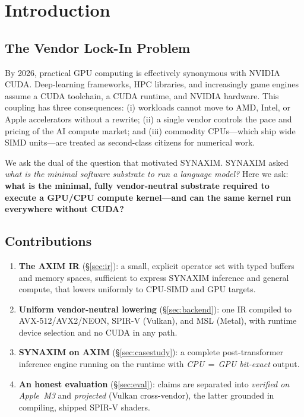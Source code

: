 \documentclass[11pt,a4paper]{article}
\begin{document}
\tableofcontents
\newpage

\section{Introduction}

\subsection{The Vendor Lock-In Problem}

By 2026, practical GPU computing is effectively synonymous with NVIDIA CUDA. Deep-learning
frameworks, HPC libraries, and increasingly game engines assume a CUDA toolchain, a CUDA
runtime, and NVIDIA hardware. This coupling has three consequences: (i) workloads cannot
move to AMD, Intel, or Apple accelerators without a rewrite; (ii) a single vendor controls
the pace and pricing of the AI compute market; and (iii) commodity CPUs---which ship wide
SIMD units---are treated as second-class citizens for numerical work.

We ask the dual of the question that motivated SYNAXIM. SYNAXIM asked \emph{what is the
minimal software substrate to run a language model?} Here we ask: \textbf{what is the
minimal, fully vendor-neutral substrate required to execute a GPU/CPU compute kernel---and
can the same kernel run everywhere without CUDA?}

\subsection{Contributions}

\begin{enumerate}
    \item \textbf{The AXIM IR} (\S\ref{sec:ir}): a small, explicit operator set with typed
    buffers and memory spaces, sufficient to express SYNAXIM inference and general compute,
    that lowers uniformly to CPU-SIMD and GPU targets.
    \item \textbf{Uniform vendor-neutral lowering} (\S\ref{sec:backend}): one IR compiled to
    AVX-512/AVX2/NEON, SPIR-V (Vulkan), and MSL (Metal), with runtime device selection and
    no CUDA in any path.
    \item \textbf{SYNAXIM on AXIM} (\S\ref{sec:casestudy}): a complete post-transformer
    inference engine running on the runtime with \emph{CPU\,$=$\,GPU bit-exact} output.
    \item \textbf{An honest evaluation} (\S\ref{sec:eval}): claims are separated into
    \emph{verified on Apple~M3} and \emph{projected} (Vulkan cross-vendor), the latter
    grounded in compiling, shipped SPIR-V shaders.
\end{enumerate}
\end{document}
